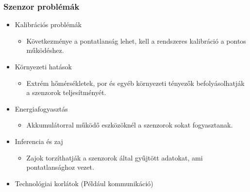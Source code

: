 \subsubsection{Szenzor problémák}
\begin{itemize}
    \item Kalibrációs problémák
    \begin{itemize}
        \item Következménye a pontatlanság lehet, kell a rendszeres kalibráció a pontos működéshez.
    \end{itemize}
    \item Környezeti hatások
    \begin{itemize}
        \item Extrém hőmérsékletek, por és egyéb környezeti tényezők befolyásolhatják a szenzorok teljesítményét.
    \end{itemize}
    \item Energiafogyasztás
    \begin{itemize}
        \item Akkumulátorral működő eszközöknél a szenzorok sokat fogyasztanak.
    \end{itemize}
    \item Inferencia és zaj
    \begin{itemize}
        \item Zajok torzíthatják a szenzorok által gyűjtött adatokat, ami pontatlansághoz vezet.
    \end{itemize}
    \item Technológiai korlátok (Például kommunikáció)
\end{itemize}

